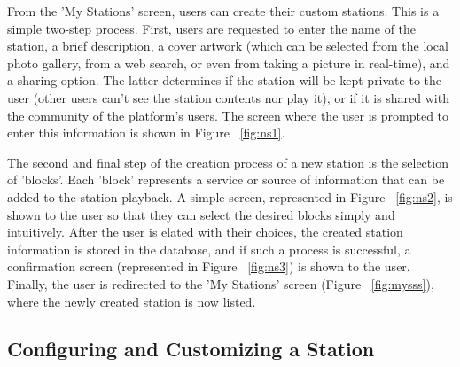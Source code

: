 From the 'My Stations' screen, users can create their custom stations. This is a simple two-step process. First, users are requested to enter the name of the station, a brief description, a cover artwork (which can be selected from the local photo gallery, from a web search, or even from taking a picture in real-time), and a sharing option. The latter determines if the station will be kept private to the user (other users can't see the station contents nor play it), or if it is shared with the community of the platform's users. The screen where the user is prompted to enter this information is shown in Figure ~\ref{fig:ns1}.


The second and final step of the creation process of a new station is the selection of 'blocks'. Each 'block' represents a service or source of information that can be added to the station playback. A simple screen, represented in Figure ~\ref{fig:ns2}, is shown to the user so that they can select the desired blocks simply and intuitively. After the user is elated with their choices, the created station information is stored in the database, and if such a process is successful, a confirmation screen  (represented in Figure ~\ref{fig:ns3}) is shown to the user. Finally, the user is redirected to the 'My Stations' screen (Figure ~\ref{fig:mysss}), where the newly created station is now listed.

\newpage
\subsection{Configuring and Customizing a Station}

